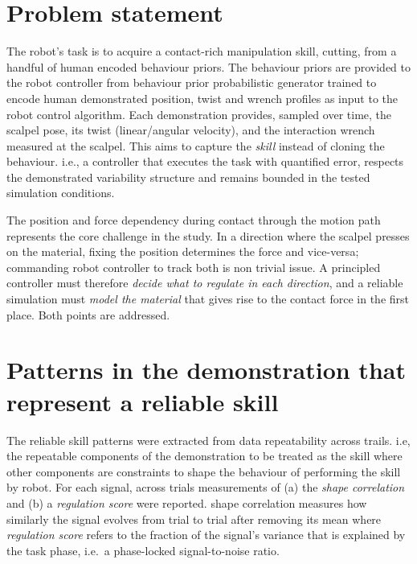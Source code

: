 \documentclass[11pt,a4paper]{article}
\begin{document}
\section{Problem statement}
The robot's task is to acquire a contact-rich manipulation skill, cutting, from a
handful of human encoded behaviour priors. The behaviour priors are provided to the robot controller from
behaviour prior probabilistic generator trained to encode human demonstrated position, twist and wrench profiles as input to
the robot control algorithm.
Each demonstration provides, sampled over time,
the scalpel pose, its twist (linear/angular velocity), and the interaction wrench
measured at the scalpel. This aims to capture the \emph{skill} instead of cloning the behaviour. i.e., a controller
that executes the task with quantified error, respects the demonstrated
variability structure and remains bounded in the tested simulation conditions.

The position and force dependency during contact through the motion path represents the core challenge in the study.
In a direction where the scalpel presses on the material, fixing the position determines the force and vice-versa;
commanding robot controller to track both is non trivial issue.
A principled controller must therefore \emph{decide what to regulate in each
direction}, and a reliable simulation must \emph{model the material} that gives
rise to the contact force in the first place. Both points are addressed.

\section{Patterns in the demonstration that represent a reliable skill}
\label{sec:analysis}
The reliable skill patterns were extracted from data repeatability across trails. i.e, the repeatable components of the
demonstration to be treated as the skill where other components are constraints to shape the behaviour of performing the skill by robot.
For each signal, across trials measurements of (a) the \emph{shape correlation} and (b) a \emph{regulation score} were reported.
shape correlation measures how similarly the signal evolves from trial to trial after removing its mean where
\emph{regulation score} refers to the fraction of the signal's variance that is
explained by the task phase, i.e.\ a phase-locked signal-to-noise ratio.
\end{document}
